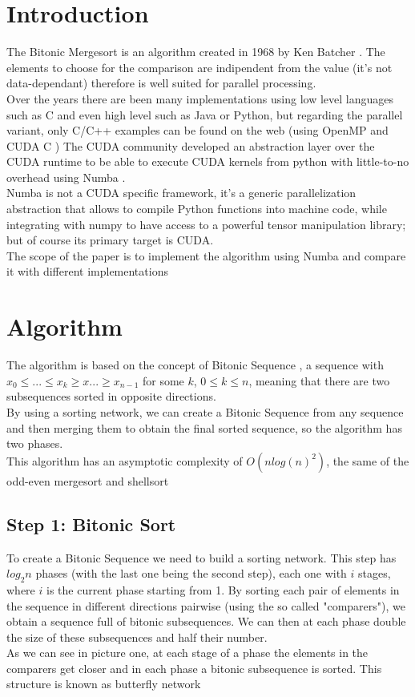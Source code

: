 \documentclass[a4paper, 12pt, oneside]{article}
\begin{document}
\section{Introduction}
The Bitonic Mergesort \cite{bitonic} is an algorithm created in 1968 by Ken Batcher \cite{ken}. The elements to choose for the comparison are indipendent from the value (it's not data-dependant) therefore is well suited for parallel processing.\\
Over the years there are been many implementations using low level languages such as C and even high level such as Java or Python, but regarding the parallel variant, only C/C++ examples can be found on the web (using OpenMP \cite{openmp} and CUDA C \cite{cudac})
The CUDA community developed an abstraction layer over the CUDA runtime to be able to execute CUDA kernels from python with little-to-no overhead using Numba \cite{numba}.\\
Numba is not a CUDA specific framework, it's a generic parallelization abstraction that allows to compile Python functions into machine code, while integrating with numpy \cite{numpy} to have access to a powerful tensor manipulation library;
but of course its primary target is CUDA.\\
The scope of the paper is to implement the algorithm using Numba and compare it with different implementations

\section{Algorithm}

The algorithm is based on the concept of Bitonic Sequence \cite{bitonic}, a sequence with $x_0 \leq ... \leq x_k \geq x ... \geq x_{n-1}$ for some $k$, $0 \leq k \le n$, meaning that there are two subsequences sorted in opposite directions.\\
By using a sorting network, we can create a Bitonic Sequence from any sequence and then merging them to obtain the final sorted sequence, so the algorithm has two phases.\\
This algorithm has an asymptotic complexity of $O(nlog(n)^2)$, the same of the odd-even mergesort \cite{oddeven} and shellsort \cite{shellsort}

\subsection{Step 1: Bitonic Sort}
To create a Bitonic Sequence we need to build a sorting network. This step has $log_2 n$ phases (with the last one being the second step), each one with $i$ stages, where $i$ is the current phase starting from 1.
By sorting each pair of elements in the sequence in different directions pairwise (using the so called "comparers"), we obtain a sequence full of bitonic subsequences. We can then at each phase double the size of these subsequences and half their number.\\
As we can see in picture one, at each stage of a phase the elements in the comparers get closer and in each phase a bitonic subsequence is sorted. This structure is known as butterfly network \cite{butterfly}
\end{document}
